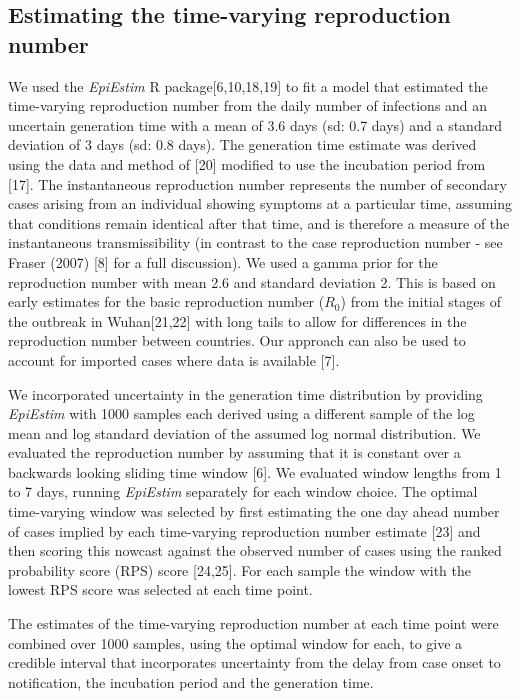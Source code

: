 \documentclass[]{article}
\begin{document}
\hypertarget{estimating-the-time-varying-reproduction-number}{%
\subsection{Estimating the time-varying reproduction
number}\label{estimating-the-time-varying-reproduction-number}}

We used the \emph{EpiEstim} R package{[}6,10,18,19{]} to fit a model
that estimated the time-varying reproduction number from the daily
number of infections and an uncertain generation time with a mean of 3.6
days (sd: 0.7 days) and a standard deviation of 3 days (sd: 0.8 days).
The generation time estimate was derived using the data and method of
{[}20{]} modified to use the incubation period from {[}17{]}. The
instantaneous reproduction number represents the number of secondary
cases arising from an individual showing symptoms at a particular time,
assuming that conditions remain identical after that time, and is
therefore a measure of the instantaneous transmissibility (in contrast
to the case reproduction number - see Fraser (2007) {[}8{]} for a full
discussion). We used a gamma prior for the reproduction number with mean
2.6 and standard deviation 2. This is based on early estimates for the
basic reproduction number (\(R_0\)) from the initial stages of the
outbreak in Wuhan{[}21,22{]} with long tails to allow for differences in
the reproduction number between countries. Our approach can also be used
to account for imported cases where data is available {[}7{]}.

We incorporated uncertainty in the generation time distribution by
providing \emph{EpiEstim} with 1000 samples each derived using a
different sample of the log mean and log standard deviation of the
assumed log normal distribution. We evaluated the reproduction number by
assuming that it is constant over a backwards looking sliding time
window {[}6{]}. We evaluated window lengths from 1 to 7 days, running
\emph{EpiEstim} separately for each window choice. The optimal
time-varying window was selected by first estimating the one day ahead
number of cases implied by each time-varying reproduction number
estimate {[}23{]} and then scoring this nowcast against the observed
number of cases using the ranked probability score (RPS) score
{[}24,25{]}. For each sample the window with the lowest RPS score was
selected at each time point.

The estimates of the time-varying reproduction number at each time point
were combined over 1000 samples, using the optimal window for each, to
give a credible interval that incorporates uncertainty from the delay
from case onset to notification, the incubation period and the
generation time.
\end{document}
